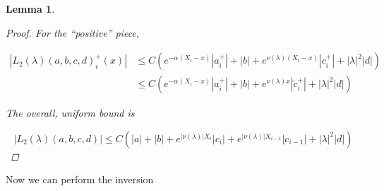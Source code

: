 \documentclass[12pt]{article}
\newtheorem{lemma}{Lemma}
\begin{document}
\begin{lemma}
\begin{proof}
For the ``positive'' piece,

\begin{align*}
|L_2(\lambda)(a,b,c,d)_i^+(x)| &\leq C (e^{-\alpha(X_i - x)}|a_i^+| + |b| + e^{\nu(\lambda)(X_i - x)} |c_i^+| + |\lambda|^2 |d| ) \\
&\leq C (e^{-\alpha(X_i - x)}|a_i^+| + |b| + e^{\nu(\lambda)x} |\tilde{c}_i^+| + |\lambda|^2 |d| ) 
\end{align*}

The overall, uniform bound is

\[
|L_2(\lambda)(a,b,c,d)| \leq C (|a| + |b| + e^{|\nu(\lambda)|X_i}|c_i| + e^{|\nu(\lambda)|X_{i-1}}|c_{i-1}| + |\lambda|^2 |d| )
\]

\end{proof}
\end{lemma}

Now we can perform the inversion

\end{document}
